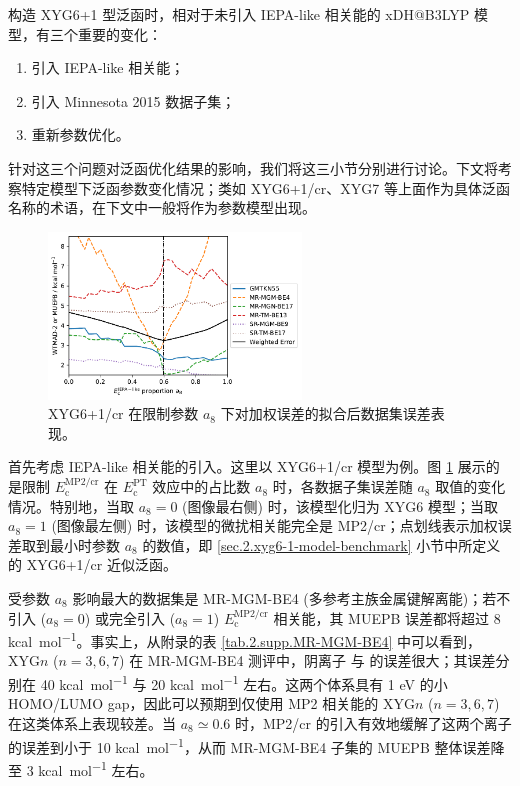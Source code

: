 构造 XYG6+1 型泛函时，相对于未引入 IEPA-like 相关能的 xDH@B3LYP 模型，有三个重要的变化：
\begin{enumerate}[nosep]
  \item 引入 IEPA-like 相关能；
  \item 引入 Minnesota 2015 数据子集；
  \item 重新参数优化。
\end{enumerate}
针对这三个问题对泛函优化结果的影响，我们将这三小节分别进行讨论。下文将考察特定模型下泛函参数变化情况；类如 XYG6+1/cr、XYG7 等上面作为具体泛函名称的术语，在下文中一般将作为参数模型出现。

\begin{figure}[h]
  \centering
  \includegraphics[width=0.6\textwidth]{assets/plot-seq-cr-proportion.pdf}
  \caption{XYG6+1/cr 在限制参数 $a_8$ 下对加权误差的拟合后数据集误差表现。}
  \label{fig.2.plot-seq-cr-proportion}
\end{figure}

首先考虑 IEPA-like 相关能的引入。这里以 XYG6+1/cr 模型为例。图 \ref{fig.2.plot-seq-cr-proportion} 展示的是限制 $E_\mathrm{c}^\text{MP2/cr}$ 在 $E_\mathrm{c}^\mathrm{PT}$ 效应中的占比数 $a_8$ 时，各数据子集误差随 $a_8$ 取值的变化情况。特别地，当取 $a_8 = 0$ (图像最右侧) 时，该模型化归为 XYG6 模型；当取 $a_8 = 1$ (图像最左侧) 时，该模型的微扰相关能完全是 MP2/cr；点划线表示加权误差取到最小时参数 $a_8$ 的数值，即 \ref{sec.2.xyg6-1-model-benchmark} 小节中所定义的 XYG6+1/cr 近似泛函。

受参数 $a_8$ 影响最大的数据集是 MR-MGM-BE4 (多参考主族金属键解离能)；若不引入 ($a_8 = 0$) 或完全引入 ($a_8 = 1$) $E_\mathrm{c}^\mathrm{MP2/cr}$ 相关能，其 MUEPB 误差都将超过 8 \si{kcal.mol^{-1}}。事实上，从附录的表 \ref{tab.2.supp.MR-MGM-BE4} 中可以看到，XYG$n$ ($n=3,6,7$) 在 MR-MGM-BE4 测评中，阴离子  与  的误差很大；其误差分别在 40 \si{kcal.mol^{-1}} 与 20 \si{kcal.mol^{-1}} 左右。这两个体系具有 1 eV 的小 HOMO/LUMO gap，因此可以预期到仅使用 MP2 相关能的 XYG$n$ ($n=3,6,7$) 在这类体系上表现较差。当 $a_8 \simeq 0.6$ 时，MP2/cr 的引入有效地缓解了这两个离子的误差到小于 10 \si{kcal.mol^{-1}}，从而 MR-MGM-BE4 子集的 MUEPB 整体误差降至 3 \si{kcal.mol^{-1}} 左右。

